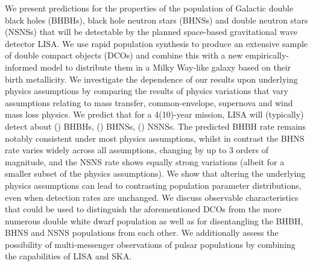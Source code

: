 We present predictions for the properties of the population of Galactic double black holes (BHBHs), black hole neutron stars (BHNSs) and double neutron stars (NSNSs) that will be detectable by the planned space-based gravitational wave detector LISA. We use rapid population synthesis to produce an extensive sample of double compact objects (DCOs) and combine this with a new empirically-informed model to distribute them in a Milky Way-like galaxy based on their birth metallicity. We investigate the dependence of our results upon underlying physics assumptions by comparing the results of \nModels{} physics variations that vary assumptions relating to mass transfer, common-envelope, supernova and wind mass loss physics. We predict that for a 4(10)-year mission, LISA will (typically) detect about \BHBHFourYear{}(\BHBHTenYear{}) BHBHs, \BHNSFourYear{}(\BHNSTenYear{}) BHNSs, \NSNSFourYear{}(\NSNSTenYear{}) NSNSs. The predicted BHBH rate remains notably consistent under most physics assumptions, whilst in contrast the BHNS rate varies widely across all assumptions, changing by up to 3 orders of magnitude, and the NSNS rate shows equally strong variations (albeit for a smaller subset of the physics assumptions). We show that altering the underlying physics assumptions can lead to contrasting population parameter distributions, even when detection rates are unchanged. We discuss observable characteristics that could be used to distinguish the aforementioned DCOs from the more numerous double white dwarf population as well as for disentangling the BHBH, BHNS and NSNS populations from each other. We additionally assess the possibility of multi-messenger observations of pulsar populations by combining the capabilities of LISA and SKA. 